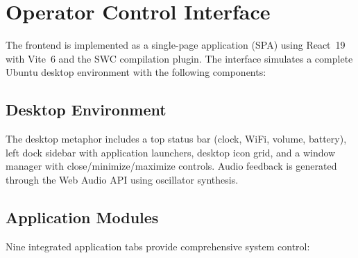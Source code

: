 \documentclass[conference]{IEEEtran}
\begin{document}
\section{Operator Control Interface}
\label{sec:ui}

The frontend is implemented as a single-page application (SPA) using React~19 with Vite~6 and the SWC compilation plugin. The interface simulates a complete Ubuntu desktop environment with the following components:

\subsection{Desktop Environment}

The desktop metaphor includes a top status bar (clock, WiFi, volume, battery), left dock sidebar with application launchers, desktop icon grid, and a window manager with close/minimize/maximize controls. Audio feedback is generated through the Web Audio API using oscillator synthesis.

\subsection{Application Modules}

Nine integrated application tabs provide comprehensive system control:
\end{document}

